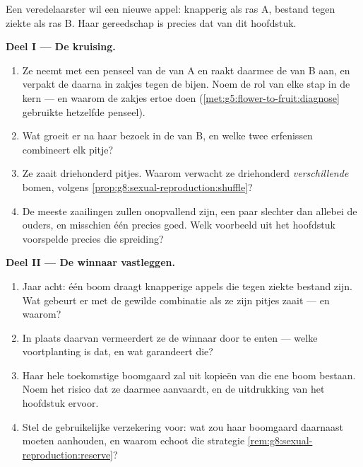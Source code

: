 \begin{problem}\label{pb:g8:sexual-reproduction:1}
Een veredelaarster wil een nieuwe appel: knapperig als ras A, bestand
tegen ziekte als ras B. Haar gereedschap is precies dat van dit hoofdstuk.

\medskip\noindent\textbf{Deel I --- De kruising.}
\begin{enumerate}
  \item Ze neemt met een penseel  van de  van A en
        raakt daarmee de  van B aan, en verpakt de  daarna
        in zakjes tegen de bijen. Noem de rol van elke stap in de kern ---
        en waarom de zakjes ertoe doen
        (\cref{met:g5:flower-to-fruit:diagnose} gebruikte hetzelfde
        penseel).
  \item Wat groeit er na haar bezoek in de  van B, en welke twee
        erfenissen combineert elk pitje?
  \item Ze zaait driehonderd pitjes. Waarom verwacht ze driehonderd
        \emph{verschillende} bomen, volgens
        \cref{prop:g8:sexual-reproduction:shuffle}?
  \item De meeste zaailingen zullen onopvallend zijn, een paar slechter
        dan allebei de ouders, en misschien één precies goed. Welk
        voorbeeld uit het hoofdstuk voorspelde precies die spreiding?
\end{enumerate}

\medskip\noindent\textbf{Deel II --- De winnaar vastleggen.}
\begin{enumerate}[resume]
  \item Jaar acht: één boom draagt knapperige appels die tegen ziekte
        bestand zijn. Wat gebeurt er met de gewilde combinatie als ze
        zijn pitjes zaait --- en waarom?
  \item In plaats daarvan vermeerdert ze de winnaar door te enten ---
        welke voortplanting is dat, en wat garandeert die?
  \item Haar hele toekomstige boomgaard zal uit kopieën van die ene boom
        bestaan. Noem het risico dat ze daarmee aanvaardt, en de
        uitdrukking van het hoofdstuk ervoor.
  \item Stel de gebruikelijke verzekering voor: wat zou haar boomgaard
        daarnaast moeten aanhouden, en waarom echoot die strategie
        \cref{rem:g8:sexual-reproduction:reserve}?
\end{enumerate}


\end{problem}
